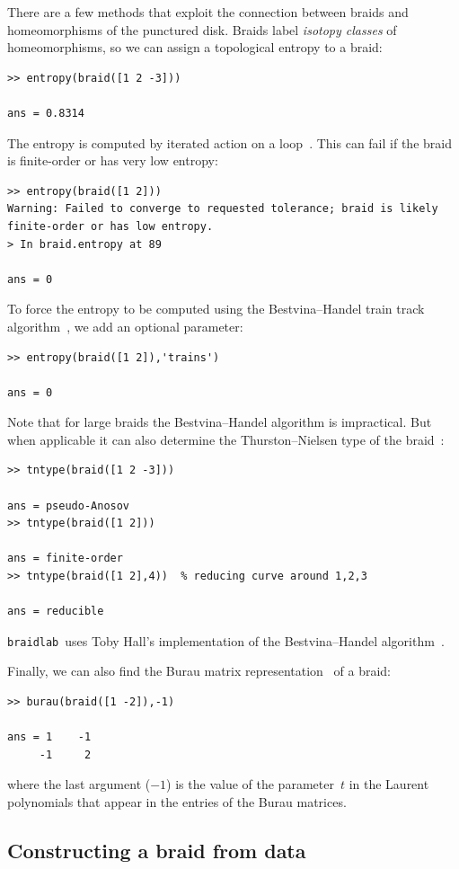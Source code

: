 \documentclass[12pt]{article}
\newcommand{\braidlab}{\texttt{braidlab}}%
\begin{document}
There are a few methods that exploit the connection between braids and
homeomorphisms of the punctured disk.  Braids label \emph{isotopy
  classes} of homeomorphisms, so we can assign a topological entropy
to a braid:
\begin{lstlisting}[frame=single,framerule=0pt]
>> entropy(braid([1 2 -3]))

ans = 0.8314
\end{lstlisting}
The entropy is computed by iterated action on a
loop~\citep{Moussafir2006}.  This can fail if the braid is
finite-order or has very low entropy:
\begin{lstlisting}[frame=single,framerule=0pt]
>> entropy(braid([1 2]))
Warning: Failed to converge to requested tolerance; braid is likely finite-order or has low entropy. 
> In braid.entropy at 89

ans = 0
\end{lstlisting}
To force the entropy to be computed using
the Bestvina--Handel train track algorithm~\cite{Bestvina1995}, we add
an optional parameter:
\begin{lstlisting}[frame=single,framerule=0pt]
>> entropy(braid([1 2]),'trains')

ans = 0
\end{lstlisting}
Note that for large braids the Bestvina--Handel algorithm is
impractical.  But when applicable it can also determine the
Thurston--Nielsen type of the
braid~\citep{Fathi1979,Thurston1988,Casson1988,Boyland1994}:
\begin{lstlisting}[frame=single,framerule=0pt]
>> tntype(braid([1 2 -3]))

ans = pseudo-Anosov
>> tntype(braid([1 2]))

ans = finite-order
>> tntype(braid([1 2],4))  % reducing curve around 1,2,3

ans = reducible
\end{lstlisting}
\braidlab\ uses Toby Hall's implementation of the Bestvina--Handel
algorithm~\citep{HallTrain}.

Finally, we can also find the Burau matrix
representation~\citep{Burau1936,Birman1975} of a braid:
\begin{lstlisting}[frame=single,framerule=0pt]
>> burau(braid([1 -2]),-1)

ans = 1    -1
     -1     2
\end{lstlisting}
where the last argument ($-1$) is the value of the parameter~$t$ in
the Laurent polynomials that appear in the entries of the Burau
matrices.


\subsection{Constructing a braid from data}
\label{sec:braidfromdata}
\end{document}
